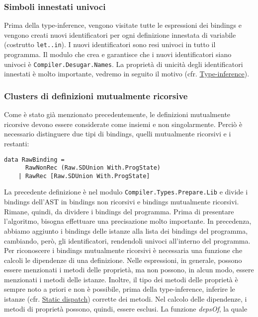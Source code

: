 \documentclass[10pt,a4paper]{article}
\begin{document}
\hypertarget{Simboli innestati univoci}{\subsubsection{Simboli innestati univoci}}
Prima della type-inference, vengono visitate tutte le espressioni dei bindings e vengono creati nuovi identificatori
per ogni definizione innestata di variabile (costrutto \texttt{let..in}). I nuovi identificatori sono resi univoci in
tutto il programma. Il modulo che crea e garantisce che i nuovi identificatori siano univoci è
\texttt{Compiler.Desugar.Names}. La proprietà di unicità degli identificatori innestati è molto importante, vedremo in
seguito il motivo (cfr. \hyperlink{Type-inference}{Type-inference}).

\hypertarget{Clusters di definizioni mutualmente ricorsive}{\subsubsection{Clusters di definizioni mutualmente ricorsive}}
Come è stato già menzionato precedentemente, le definizioni mutualmente ricorsive devono essere considerate come insiemi
e non singolarmente. Perciò è necessario distinguere due tipi di bindings, quelli mutualmente ricorsivi e i restanti:
\begin{lstlisting}
data RawBinding =
      RawNonRec (Raw.SDUnion With.ProgState)
    | RawRec [Raw.SDUnion With.ProgState]
\end{lstlisting}
La precedente definizione è nel modulo \texttt{Compiler.Types.Prepare.Lib} e divide i bindings dell'AST in bindings
non ricorsivi e bindings mutualmente ricorsivi. Rimane, quindi, da dividere i bindings del programma. Prima di presentare
l'algoritmo, bisogna effettuare una precisazione molto importante. In precedenza, abbiamo aggiunto i bindings delle
istanze alla lista dei bindings del programma, cambiando, però, gli identificatori, rendendoli univoci all'interno del
programma. Per riconoscere i bindings mutualmente ricorsivi è necessaria una funzione che calcoli le dipendenze
di una definizione. Nelle espressioni, in generale, possono essere menzionati i metodi delle proprietà, ma non possono,
in alcun modo, essere menzionati i metodi delle istanze. Inoltre, il tipo dei metodi delle proprietà è sempre noto a
priori e non è possibile, prima della type-inference, inferire le istanze (cfr. \hyperlink{Static dispatch}{Static dispatch})
corrette dei metodi.
Nel calcolo delle dipendenze, i metodi di proprietà possono, quindi, essere esclusi. La funzione \textit{depsOf}, la quale
\end{document}

